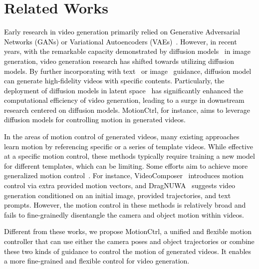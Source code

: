 \documentclass[sigconf]{acmart}
\begin{document}
\section{Related Works}
\textcolor{black}{
Early research in video generation primarily relied on Generative Adversarial Networks (GANs) or Variational Autoencoders (VAEs)~\cite{vondrick2016generating,tulyakov2018mocogan,wang2019few,skorokhodov2022stylegan,wang2019few,saito2017temporal}. However, in recent years, with the remarkable capacity demonstrated by diffusion models~\cite{ho2020denoising,ldm,t2i1} in image generation, video generation research has shifted towards utilizing diffusion models. By further incorporating with text~\cite{ho2022imagen,singer2022make,zhou2022magicvideo,he2022lvdm,blattmann2023align,wang2023videocomposer,guo2023animatediff,chen2023videocrafter1} or image~\cite{yin2023nuwa,blattmann2023stable} guidance, diffusion model can generate high-fidelity videos with specific contents. Particularly, the deployment of diffusion models in latent space~\cite{ldm,he2022lvdm,blattmann2023align} has significantly enhanced the computational efficiency of video generation, leading to a surge in downstream research centered on diffusion models. MotionCtrl, for instance, aims to leverage diffusion models for controlling motion in generated videos.
}

\textcolor{black}{
In the areas of motion control of generated videos, many existing approaches learn motion by referencing specific or a series of template videos\cite{wu2022tune,guo2023animatediff,wu2023lamp,zhao2023motiondirector}. While effective at a specific motion control, these methods typically require training a new model for different templates, which can be limiting.
%
Some efforts aim to achieve more generalized motion control~\cite{chen2023motion,wang2023videocomposer,yin2023dragnuwa}. For instance, VideoComposer~\cite{wang2023videocomposer} introduces motion control via extra provided motion vectors, and DragNUWA~\cite{yin2023dragnuwa} suggests video generation conditioned on an initial image, provided trajectories, and text prompts. However, the motion control in these methods is relatively broad and fails to fine-grainedly disentangle the camera and object motion within videos.
}

\textcolor{black}{
Different from these works, we propose MotionCtrl, a unified and flexible motion controller that can use either the camera poses and object trajectories or combine these two kinds of guidance to control the motion of generated videos. It enables a more fine-grained and flexible control for video generation.
}
\end{document}
